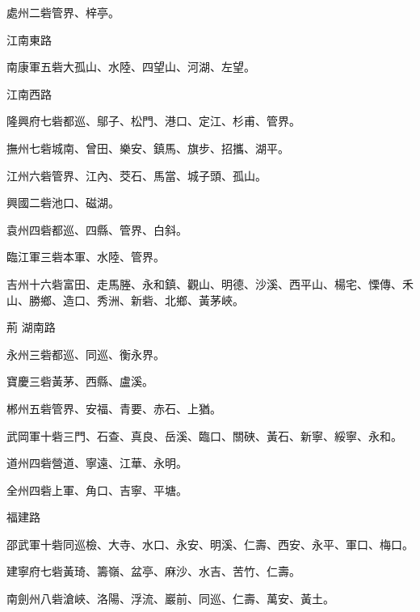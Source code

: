 \begin{pinyinscope}
 處州二砦管界、梓亭。



 江南東路



 南康軍五砦大孤山、水陸、四望山、河湖、左望。



 江南西路



 隆興府七砦都巡、鄔子、松門、港口、定江、杉甫、管界。



 撫州七砦城南、曾田、樂安、鎮馬、旗步、招攜、湖平。



 江州六砦管界、江內、茭石、馬當、城子頭、孤山。



 興國二砦池口、磁湖。



 袁州四砦都巡、四縣、管界、白斜。



 臨江軍三砦本軍、水陸、管界。



 吉州十六砦富田、走馬塍、永和鎮、觀山、明德、沙溪、西平山、楊宅、慄傳、禾山、勝鄉、造口、秀洲、新砦、北鄉、黃茅峽。



 荊
 湖南路



 永州三砦都巡、同巡、衡永界。



 寶慶三砦黃茅、西縣、盧溪。



 郴州五砦管界、安福、青要、赤石、上猶。



 武岡軍十砦三門、石查、真良、岳溪、臨口、關硤、黃石、新寧、綏寧、永和。



 道州四砦營道、寧遠、江華、永明。



 全州四砦上軍、角口、吉寧、平塘。



 福建路



 邵武軍十砦同巡檢、大寺、水口、永安、明溪、仁壽、西安、永平、軍口、梅口。



 建寧府七砦黃琦、籌嶺、盆亭、麻沙、水吉、苦竹、仁壽。



 南劍州八砦滄峽、洛陽、浮流、巖前、同巡、仁壽、萬安、黃土。




\end{pinyinscope}
